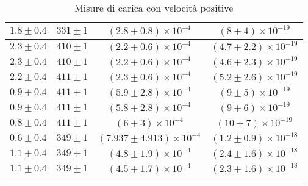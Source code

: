 \begin{longtable}[C]{|c|c|c|c|}
            \hline
            $1.8 \pm 0.4$ & $331 \pm 1$ & $(2.8 \pm 0.8) \times 10^{-4}$ & $(8 \pm 4) \times 10^{-19}$ \\
            \hline
            $2.3 \pm 0.4$ & $410 \pm 1$ & $(2.2 \pm 0.6) \times 10^{-4}$ & $(4.7 \pm 2.2) \times 10^{-19}$ \\
            \hline
            $2.3 \pm 0.4$ & $410 \pm 1$ & $(2.2 \pm 0.6) \times 10^{-4}$ & $(4.6 \pm 2.3) \times 10^{-19}$ \\
            \hline
            $2.2 \pm 0.4$ & $411 \pm 1$ & $(2.3 \pm 0.6) \times 10^{-4}$ & $(5.2 \pm 2.6) \times 10^{-19}$ \\
            \hline
            $0.9 \pm 0.4$ & $411 \pm 1$ & $(5.9 \pm 2.8) \times 10^{-4}$ & $(9 \pm 5) \times 10^{-19}$ \\
            \hline
            $0.9 \pm 0.4$ & $411 \pm 1$ & $(5.8 \pm 2.8) \times 10^{-4}$ & $(9 \pm 6) \times 10^{-19}$ \\
            \hline
            $0.8 \pm 0.4$ & $411 \pm 1$ & $(6 \pm 3) \times 10^{-4}$ & $(10 \pm 7) \times 10^{-19}$ \\
            \hline
            $0.6 \pm 0.4$ & $349 \pm 1$ & $(7.937 \pm 4.913) \times 10^{-4}$ & $(1.2 \pm 0.9) \times 10^{-18}$ \\
            \hline
            $1.1 \pm 0.4$ & $349 \pm 1$ & $(4.8 \pm 1.9) \times 10^{-4}$ & $(2.4 \pm 1.6) \times 10^{-18}$ \\
            \hline
            $1.1 \pm 0.4$ & $349 \pm 1$ & $(4.5 \pm 1.7) \times 10^{-4}$ & $(2.3 \pm 1.6) \times 10^{-18}$ \\
            \hline
            \caption{Misure di carica con velocità positive}
        \end{longtable}
